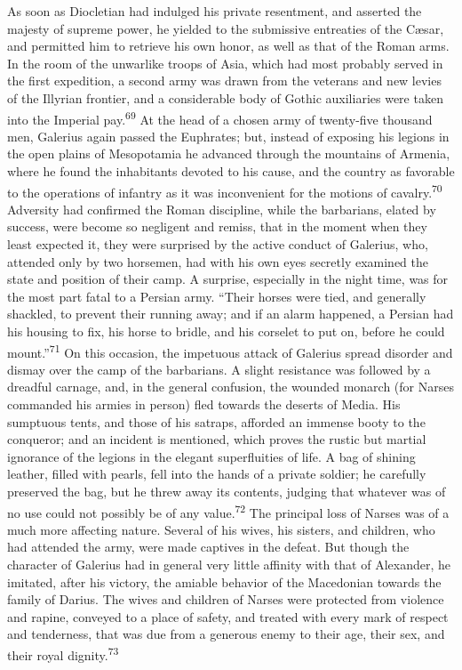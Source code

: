 As soon as Diocletian had indulged his private resentment, and
asserted the majesty of supreme power, he yielded to the
submissive entreaties of the Cæsar, and permitted him to retrieve
his own honor, as well as that of the Roman arms. In the room of
the unwarlike troops of Asia, which had most probably served in
the first expedition, a second army was drawn from the veterans
and new levies of the Illyrian frontier, and a considerable body
of Gothic auxiliaries were taken into the Imperial pay.\textsuperscript{69} At the
head of a chosen army of twenty-five thousand men, Galerius again
passed the Euphrates; but, instead of exposing his legions in the
open plains of Mesopotamia he advanced through the mountains of
Armenia, where he found the inhabitants devoted to his cause, and
the country as favorable to the operations of infantry as it was
inconvenient for the motions of cavalry.\textsuperscript{70} Adversity had
confirmed the Roman discipline, while the barbarians, elated by
success, were become so negligent and remiss, that in the moment
when they least expected it, they were surprised by the active
conduct of Galerius, who, attended only by two horsemen, had with
his own eyes secretly examined the state and position of their
camp. A surprise, especially in the night time, was for the most
part fatal to a Persian army. “Their horses were tied, and
generally shackled, to prevent their running away; and if an
alarm happened, a Persian had his housing to fix, his horse to
bridle, and his corselet to put on, before he could mount.”\textsuperscript{71} On
this occasion, the impetuous attack of Galerius spread disorder
and dismay over the camp of the barbarians. A slight resistance
was followed by a dreadful carnage, and, in the general
confusion, the wounded monarch (for Narses commanded his armies
in person) fled towards the deserts of Media. His sumptuous
tents, and those of his satraps, afforded an immense booty to the
conqueror; and an incident is mentioned, which proves the rustic
but martial ignorance of the legions in the elegant superfluities
of life. A bag of shining leather, filled with pearls, fell into
the hands of a private soldier; he carefully preserved the bag,
but he threw away its contents, judging that whatever was of no
use could not possibly be of any value.\textsuperscript{72} The principal loss of
Narses was of a much more affecting nature. Several of his wives,
his sisters, and children, who had attended the army, were made
captives in the defeat. But though the character of Galerius had
in general very little affinity with that of Alexander, he
imitated, after his victory, the amiable behavior of the
Macedonian towards the family of Darius. The wives and children
of Narses were protected from violence and rapine, conveyed to a
place of safety, and treated with every mark of respect and
tenderness, that was due from a generous enemy to their age,
their sex, and their royal dignity.\textsuperscript{73}

